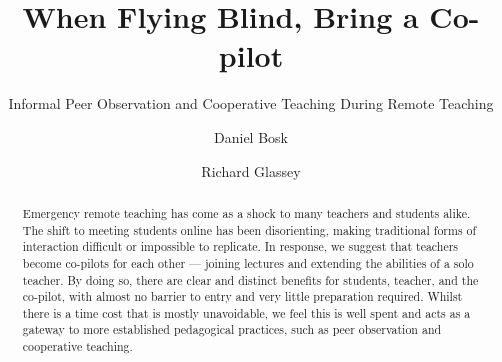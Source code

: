 \documentclass[sigconf,natbib=false]{acmart}
\begin{document}
\title{When Flying Blind, Bring a Co-pilot}
\subtitle{Informal Peer Observation and Cooperative Teaching During Remote Teaching}


\author{Daniel Bosk}
\orcid{}

\author{Richard Glassey}
\orcid{}
\fancyhead{}


\begin{abstract}

Emergency remote teaching has come as a shock to many teachers and students alike. The shift to meeting students online has been disorienting, making traditional forms of interaction difficult or impossible to replicate. In response, we suggest that teachers become co-pilots for each other --- joining lectures and extending the abilities of a solo teacher. By doing so, there are clear and distinct benefits for students, teacher, and the co-pilot, with almost no barrier to entry and very little preparation required. Whilst there is a time cost that is mostly unavoidable, we feel this is well spent and acts as a gateway to more established pedagogical practices, such as peer observation and cooperative teaching.

\end{abstract}

\begin{CCSXML}

\end{CCSXML}
\end{document}
